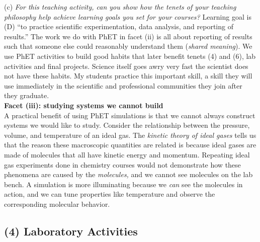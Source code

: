 \documentclass[../../../main.tex]{subfiles}
\begin{document}
\vspace{0.15cm}
(c) \textit{For this teaching activity, can you show how the tenets of your teaching philosophy help achieve learning goals you
set for your courses?} Learning goal is (D) ``to practice scientific experimentation, data analysis, and reporting of results.''  The work we do with PhET in facet (ii) is all about reporting of results such that someone else could reasonably understand them (\textit{shared meaning}).  We use PhET activities to build good habits that later benefit tenets (4) and (6), lab activities and final projects.  Science itself goes awry very fast the scientist does not have these habits.  My students practice this important skill, a skill they will use immediately in the scientific and professional communities they join after they graduate.
\\
\vspace{0.15cm}
\textbf{Facet (iii): studying systems we cannot build}
\\
\vspace{0.15cm}
A practical benefit of using PhET simulations is that we cannot always construct systems we would like to study.  Consider the relationship between the pressure, volume, and temperature of an ideal gas.  The \textit{kinetic theory of ideal gases} tells us that the reason these macroscopic quantities are related is because ideal gases are made of molecules that all have kinetic energy and momentum.  Repeating ideal gas experiments done in chemistry courses would not demonstrate how these phenomena are caused by the \textit{molecules,} and we cannot see molecules on the lab bench.  A simulation is more illuminating because we \textit{can} see the molecules in action, and we can tune properties like temperature and observe the corresponding molecular behavior.

\subsection{(4) Laboratory Activities}
\end{document}
